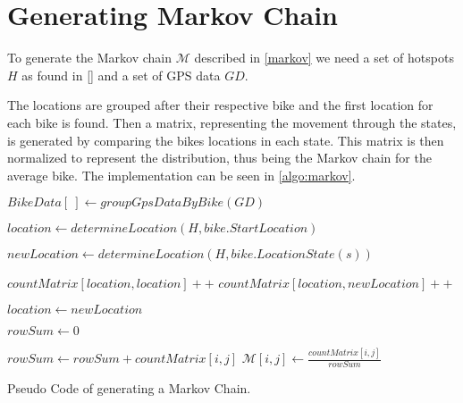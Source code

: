 \section{Generating Markov Chain}\label{sec:generatemarkov}
To generate the Markov chain $\mathcal{M}$ described in \cref{markov} we need a set of hotspots $H$ as found in \cref{} and a set of GPS data $GD$.

The locations are grouped after their respective bike and the first location for each bike is found.
Then a matrix, representing the movement through the states, is generated by comparing the bikes locations in each state.
This matrix is then normalized to represent the distribution, thus being the Markov chain for the average bike.
The implementation can be seen in \cref{algo:markov}.


\begin{algorithm}[H]
 

$BikeData[\ ] \gets groupGpsDataByBike(GD)$
 
{
	$location \gets determineLocation(H, bike.StartLocation)$
}
 
{
	{
 		$newLocation \gets determineLocation(H, bike.LocationState(s))$
 		
 		{
 			$countMatrix[location, location]++$
 		}
 		{
 			$countMatrix[location, newLocation]++$
 		}
 		
 		$location \gets newLocation$
 	}
}

{
	$rowSum \gets 0$
 	 
	{
 		$rowSum \gets rowSum + countMatrix[i, j]$
 	}
 	{
		$\mathcal{M}[i, j] \gets \frac{countMatrix[i, j]}{rowSum}$
	}
 }
 \caption{Pseudo Code of generating a Markov Chain.}
 \label{algo:markov}
\end{algorithm}
